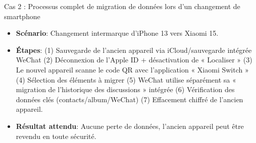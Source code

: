 \begin{tcbinfo}{Cas 2 : Processus complet de migration de données lors d'un changement de smartphone}
\begin{itemize}
  \item \textbf{Scénario}: Changement intermarque d'iPhone 13 vers Xiaomi 15.
  \item \textbf{Étapes}: (1) Sauvegarde de l'ancien appareil via iCloud/sauvegarde intégrée WeChat (2) Déconnexion de l'Apple ID + désactivation de « Localiser » (3) Le nouvel appareil scanne le code QR avec l'application « Xiaomi Switch » (4) Sélection des éléments à migrer (5) WeChat utilise séparément sa « migration de l'historique des discussions » intégrée (6) Vérification des données clés (contacts/album/WeChat) (7) Effacement chiffré de l'ancien appareil.
  \item \textbf{Résultat attendu}: Aucune perte de données, l'ancien appareil peut être revendu en toute sécurité.
\end{itemize}

\end{tcbinfo}
